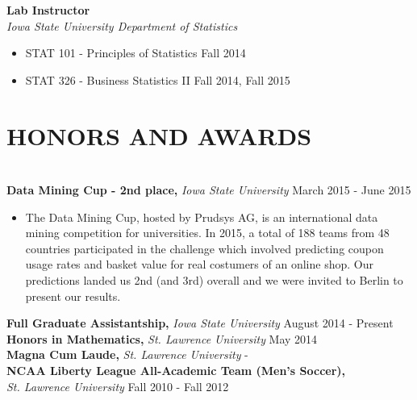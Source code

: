 \documentclass{res} %
\begin{document}
\begin{resume}
{\bf Lab Instructor} \\
{\sl Iowa State University Department of Statistics}
\begin{itemize} \itemsep -2pt 
\item STAT 101 - Principles of Statistics \hfill Fall 2014
\item STAT 326 - Business Statistics II \hfill Fall 2014, Fall 2015
\end{itemize}



%


\section{HONORS AND AWARDS}

\hrulefill \\
{\bf Data Mining Cup - 2nd place,} {\sl Iowa State University} \dotfill March 2015 -
June 2015 
\begin{itemize} \itemsep -2pt
  \item The Data Mining Cup, hosted by Prudsys AG, is an international data
    mining competition for universities. In 2015, a total of 188 teams from 48
    countries participated in the challenge which involved predicting coupon
    usage rates and basket value for real costumers of an online shop. Our
    predictions landed us 2nd (and 3rd) overall and we were invited to Berlin to
    present our results.
\end{itemize}
\vspace{-1em}
{\bf Full Graduate Assistantship,} {\sl Iowa State University} \dotfill August 2014 - Present \\
{\bf Honors in Mathematics,} {\sl St. Lawrence University} \dotfill May 2014 \\
{\bf Magna Cum Laude,} {\sl St. Lawrence University} \hfill - \\
{\bf NCAA Liberty League All-Academic Team (Men's Soccer),} \\
{\sl St. Lawrence University} \dotfill Fall 2010 - Fall 2012 


\end{resume}
\end{document}

